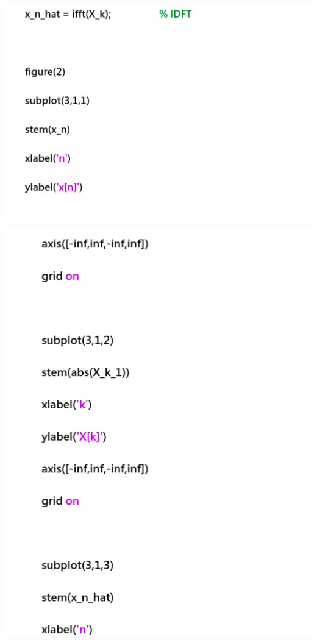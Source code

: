 \documentclass[a4paper]{article}
\begin{document}
	
	\begin{center}
		\includegraphics[width=1\linewidth]{screenshot088}
	\end{center}
	
	\begin{center}
		\includegraphics[width=1\linewidth]{screenshot089}
	\end{center}
	
\end{document}
